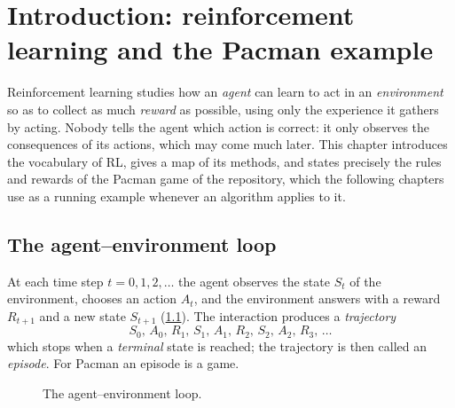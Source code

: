 \chapter[Introduction]{Introduction: reinforcement learning and the Pacman
  example}
\label{ch:pacman}

Reinforcement learning studies how an \emph{agent} can learn to act in an
\emph{environment} so as to collect as much \emph{reward} as possible, using
only the experience it gathers by acting. Nobody tells the agent which
action is correct: it only observes the consequences of its actions, which
may come much later. This chapter introduces the vocabulary of RL, gives a
map of its methods, and states precisely the rules and rewards of the Pacman
game of the repository, which the following chapters use as a running
example whenever an algorithm applies to it.

\section{The agent--environment loop}

At each time step $t = 0, 1, 2, \dots$ the agent observes the state $S_t$ of
the environment, chooses an action $A_t$, and the environment answers with
a reward $R_{t+1}$ and a new state $S_{t+1}$
(\cref{fig:loop}). The interaction produces a \emph{trajectory}
\begin{equation}
  S_0,\, A_0,\, R_1,\, S_1,\, A_1,\, R_2,\, S_2,\, A_2,\, R_3,\, \dots
\end{equation}
which stops when a \emph{terminal} state is reached; the trajectory is then
called an \emph{episode}. For Pacman an episode is a game.

\begin{figure}[ht]
  \centering
  \caption{The agent--environment loop.}
  \label{fig:loop}
\end{figure}

